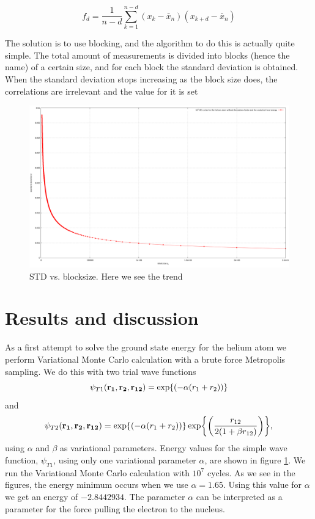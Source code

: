 \documentclass[11pt]{article}
\begin{document}
\[
f_d=\frac{1}{n-d}\sum_{k=1}^{n-d}{\left(x_k-\bar{x}_n\right)\left(x_{k+d}-\bar{x}_n\right)}
\]


			The solution is to use blocking, and the algorithm to do this is actually quite simple. The total amount of measurements is divided into blocks (hence the name) of a certain size, and for each block the standard deviation is obtained. When the standard deviation stops increasing as the block size does, the correlations are irrelevant and the value for it is set


			\begin{figure}
\centering \includegraphics[width=0.45\linewidth]{figures/blockingheliumsimpleandalytical}
\protect\caption{STD vs. blocksize. Here we see the trend }
\label{fig01:alpha_Simple} 
\end{figure}



\section{Results and discussion}
	

As a first attempt to solve the ground state energy for the helium
atom we perform Variational Monte Carlo calculation with a brute force
Metropolis sampling. We do this with two trial wave functions
\[
\psi_{T1}({\bf r_{1}},{\bf r_{2}},{\bf r_{12}})=\exp{\left(-\alpha(r_{1}+r_{2})\right)}
\]
and 
\[
\psi_{T2}({\bf r_{1}},{\bf r_{2}},{\bf r_{12}})=\exp{\left(-\alpha(r_{1}+r_{2})\right)}\exp{\left(\frac{r_{12}}{2(1+\beta r_{12})}\right)},
\]
using $\alpha$ and $\beta$ as variational parameters. Energy values
for the simple wave function, $\psi_{T1}$, using only one variational
parameter $\alpha$, are shown in figure \ref{fig01:alpha_Simple}.
We run the Variational Monte Carlo calculation with $10^{7}$ cycles.
As we see in the figures, the energy minimum occurs when we use $\alpha=1.65$.
Using this value for $\alpha$ we get an energy of $-2.8442934$. 
The parameter $\alpha$ can be interpreted as a parameter for the
force pulling the electron to the nucleus. 
\end{document}

